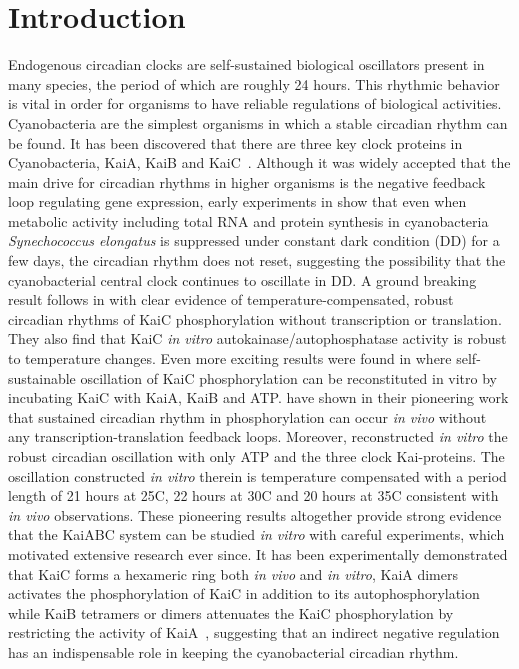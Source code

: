 \documentclass[a4paper,10pt]{article}
\numberwithin{equation}{section}
\begin{document}
\section{Introduction}
Endogenous circadian clocks are self-sustained biological oscillators present in many species, the period of which are roughly 24 hours. This rhythmic behavior is vital in order for organisms to have reliable regulations of biological activities. Cyanobacteria are the simplest organisms in which a stable circadian rhythm can be found. It has been discovered that there are three key clock proteins in Cyanobacteria, KaiA, KaiB and KaiC~\citet{ishi1998}. Although it was widely accepted that the main drive for circadian rhythms in higher organisms is the negative feedback loop regulating gene expression, early experiments in  \citet{johnson2000} show that even when metabolic activity including total RNA and protein synthesis in cyanobacteria \textit{Synechococcus elongatus} is suppressed under constant dark condition (DD) for a few days, the circadian rhythm does not reset, suggesting the possibility that the cyanobacterial central clock  continues to oscillate in DD. A ground breaking result follows in \citet{Tamito2005} with clear evidence of temperature-compensated, robust circadian rhythms of
KaiC phosphorylation without transcription or translation. They also find that KaiC \textit{in vitro} autokainase/autophosphatase activity is robust to temperature changes. Even more exciting results were found in   \citet{nakajima2005} where self-sustainable oscillation of KaiC phosphorylation can be  reconstituted in
vitro by incubating KaiC with KaiA, KaiB and ATP. \citet{Tamito2005} have shown in their pioneering work that sustained circadian rhythm in phosphorylation can occur \textit{in vivo} without any transcription-translation feedback loops. Moreover, \citet{nakajima2005}	reconstructed \textit{in vitro} the robust circadian oscillation with only ATP and the three clock Kai-proteins.
The oscillation constructed \textit{in vitro} therein is temperature compensated with a period length of 21 hours at 25\degree C, 22 hours at 30\degree C and 20 hours at 35\degree C consistent with \textit{in vivo} observations.  These pioneering results altogether provide strong evidence that the KaiABC system can be studied \textit{in vitro} with careful experiments, which motivated extensive research ever since. It has been experimentally demonstrated that KaiC forms a hexameric ring both \textit{in vivo} and \textit{in
vitro}, KaiA dimers~\citet{kageyama2003} activates the phosphorylation of KaiC in addition to its autophosphorylation~\citet{iwasaki2002} while KaiB tetramers or dimers attenuates the KaiC phosphorylation by restricting the activity of KaiA~\citet{iwasaki2002,kitayama2003}, suggesting that an indirect negative regulation has an indispensable role in keeping the cyanobacterial circadian rhythm. 
\end{document}
